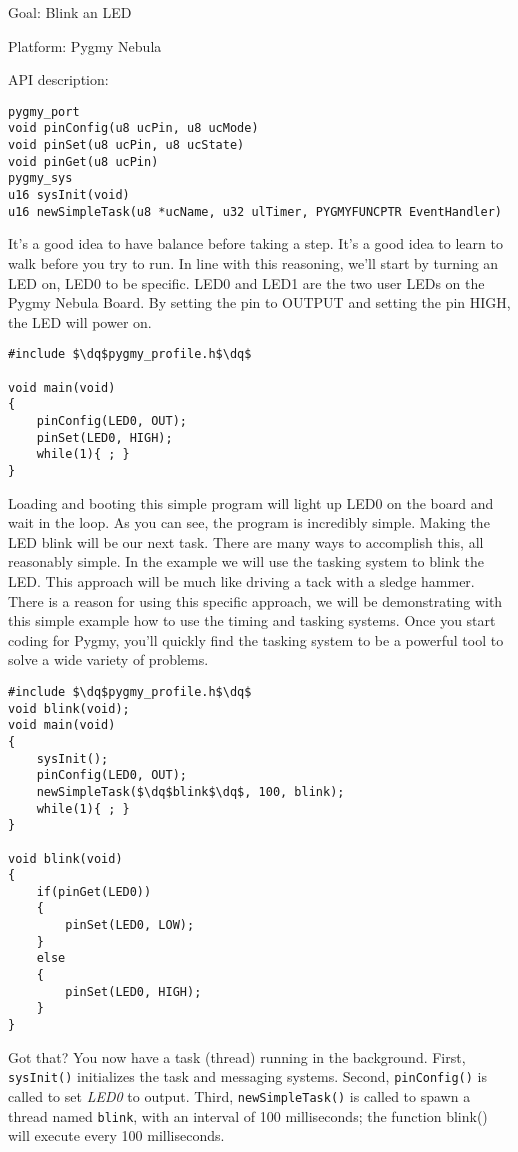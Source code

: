 \documentclass{article}
\newcommand{\dq}{\textquotedbl}
\begin{document}
Goal: Blink an LED

Platform: Pygmy Nebula

API description:

\begin{lstlisting}
pygmy_port
void pinConfig(u8 ucPin, u8 ucMode)
void pinSet(u8 ucPin, u8 ucState)
void pinGet(u8 ucPin)
pygmy_sys
u16 sysInit(void)
u16 newSimpleTask(u8 *ucName, u32 ulTimer, PYGMYFUNCPTR EventHandler)
\end{lstlisting}

It's a good idea to have balance before taking a step. It's a good idea to learn to walk before you try to run. In line with this reasoning, we'll start by turning an LED on, LED0 to be specific. LED0 and LED1 are the two user LEDs on the Pygmy Nebula Board. By setting the pin to OUTPUT and setting the pin HIGH, the LED will power on.

\begin{lstlisting}
#include $\dq$pygmy_profile.h$\dq$

void main(void)
{
	pinConfig(LED0, OUT);
	pinSet(LED0, HIGH);
	while(1){ ; }
}
\end{lstlisting}

Loading and booting this simple program will light up LED0 on the board and wait in the loop. As you can see, the program is incredibly simple. Making the LED blink will be our next task. There are many ways to accomplish this, all reasonably simple. In the example we will use the tasking system to blink the LED. This approach will be much like driving a tack with a sledge hammer. There is a reason for using this specific approach, we will be demonstrating with this simple example how to use the timing and tasking systems. Once you start coding for Pygmy, you'll quickly find the tasking system to be a powerful tool to solve a wide variety of problems.

\begin{lstlisting}
#include $\dq$pygmy_profile.h$\dq$
void blink(void);
void main(void)
{
	sysInit();
	pinConfig(LED0, OUT);
	newSimpleTask($\dq$blink$\dq$, 100, blink);
	while(1){ ; }
}

void blink(void)
{
	if(pinGet(LED0))
	{
		pinSet(LED0, LOW);
	}
	else
	{
		pinSet(LED0, HIGH);
	}
}
\end{lstlisting}

Got that? You now have a task (thread) running in the background. First, \verb|sysInit()| initializes the task and messaging systems. Second, \verb|pinConfig()| is called to set \emph{LED0} to output. Third, \verb|newSimpleTask()| is called to spawn a thread named \verb|blink|, with an interval of 100 milliseconds; the function blink() will execute every 100 milliseconds.
\end{document}
